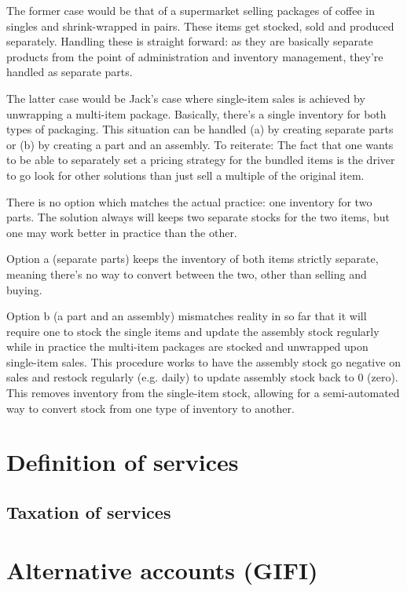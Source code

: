 The former case would be that of a supermarket selling packages of coffee in
singles and shrink-wrapped in pairs. These items get stocked, sold and produced separately.
Handling these is straight forward: as they are basically separate products from the point
of administration and inventory management, they're handled as separate parts.

The latter case would be Jack's case where single-item sales is achieved by unwrapping
a multi-item package. Basically, there's a single inventory for both types of packaging.
This situation can be handled (a) by creating separate parts or (b) by creating a part and an
assembly.
To reiterate: The fact that one wants to be able to separately set a pricing strategy
for the bundled items is the driver to go look for other solutions than just sell a
multiple of the original item.

There is no option which matches the actual practice: one inventory for two parts. The solution
always will keeps two separate stocks for the two items, but one may work better in practice
than the other.

Option a (separate parts) keeps the inventory of both items strictly separate,
meaning there's no way to convert between the two, other than selling and buying.

Option b (a part and an assembly) mismatches reality in so far that it will require one
to stock the single items and update the assembly stock regularly while in practice the
multi-item packages are stocked and unwrapped upon single-item sales. This procedure works
to have the assembly stock go negative on sales and restock regularly (e.g. daily) to
update assembly stock back to 0 (zero). This removes inventory from the single-item stock,
allowing for a semi-automated way to convert stock from one type of inventory to another.


\section{Definition of services}
\label{sec-products-services-definition}

\subsection{Taxation of services}
\label{subsec-products-services-taxation}

\section{Alternative accounts (GIFI)}
\label{sec-coa-gifi}

